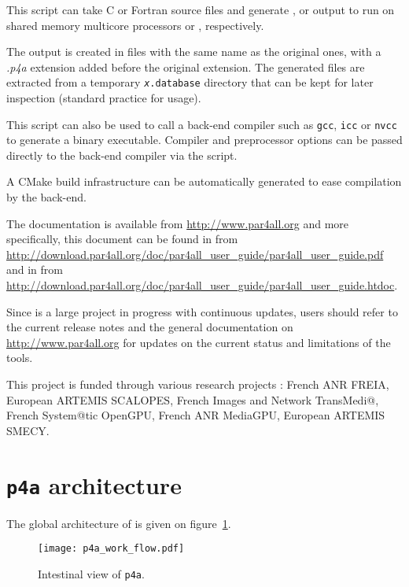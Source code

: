 \documentclass[a4paper]{article}
\begin{document}
This script can take C or Fortran source files and generate \Aopenmp,
\Acuda or \Aopencl output to run on shared memory multicore processors or
\Agpu, respectively.

The output is created in files with the same name as the original ones, with a
\emph{.p4a} extension added before the original extension. The generated files are
extracted from a temporary \texttt{\emph{x}.database} directory that can be kept
for later inspection (standard practice for \Apips usage).

This script can also be used to call a back-end compiler such as
\texttt{gcc}, \texttt{icc} or \texttt{nvcc} to generate a binary
executable. Compiler and preprocessor options can be passed directly
to the back-end compiler via the script.

A CMake build infrastructure can be automatically generated to ease
compilation by the back-end.

The \Apfa documentation is available from \url{http://www.par4all.org} and
more specifically, this document can be found in \Apdf from
\url{http://download.par4all.org/doc/par4all_user_guide/par4all_user_guide.pdf}
and in \Ahtml from
\url{http://download.par4all.org/doc/par4all_user_guide/par4all_user_guide.htdoc}.

Since \Apfa is a large project in progress with continuous updates,
users should refer to the current release notes and the general
documentation on
\url{http://www.par4all.org} for updates on
the current status and limitations of the tools.

This project is funded through various research projects : French ANR
FREIA, European ARTEMIS SCALOPES, French Images and Network TransMedi@,
French System@tic OpenGPU, French ANR MediaGPU, European ARTEMIS SMECY.

\section{\protect\texttt{p4a} architecture}
\label{sec:p4a-architecture}

The global architecture of \Apfa is given on
figure~\ref{fig:transit_intestinal}.

\begin{figure}
  \texttt{[image: p4a\_work\_flow.pdf]}
  \caption{Intestinal view of \texttt{p4a}.}
  \label{fig:transit_intestinal}
\end{figure}
\end{document}
